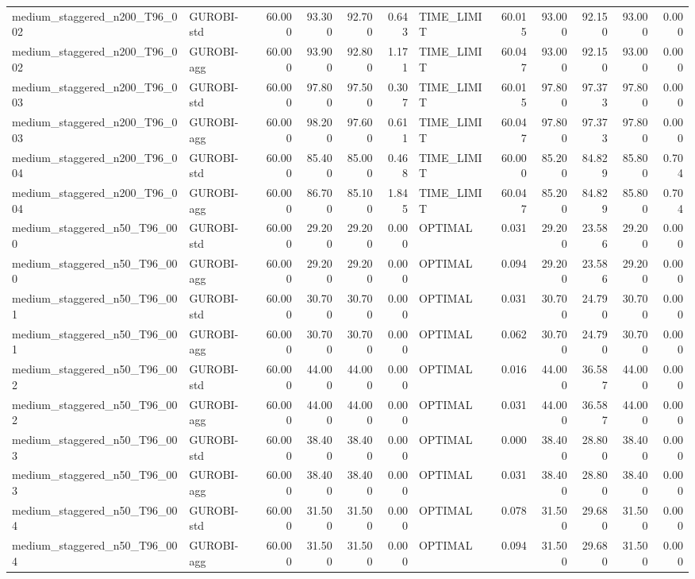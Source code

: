 \begin{table}[htbp]
\begin{tabular}{llrrrrlrrrrr}
medium\_staggered\_n200\_T96\_002 & GUROBI-std & 60.000 & 93.300 & 92.700 & 0.643 & TIME\_LIMIT & 60.015 & 93.000 & 92.150 & 93.000 & 0.000 \\
medium\_staggered\_n200\_T96\_002 & GUROBI-agg & 60.000 & 93.900 & 92.800 & 1.171 & TIME\_LIMIT & 60.047 & 93.000 & 92.150 & 93.000 & 0.000 \\
medium\_staggered\_n200\_T96\_003 & GUROBI-std & 60.000 & 97.800 & 97.500 & 0.307 & TIME\_LIMIT & 60.015 & 97.800 & 97.373 & 97.800 & 0.000 \\
medium\_staggered\_n200\_T96\_003 & GUROBI-agg & 60.000 & 98.200 & 97.600 & 0.611 & TIME\_LIMIT & 60.047 & 97.800 & 97.373 & 97.800 & 0.000 \\
medium\_staggered\_n200\_T96\_004 & GUROBI-std & 60.000 & 85.400 & 85.000 & 0.468 & TIME\_LIMIT & 60.000 & 85.200 & 84.829 & 85.800 & 0.704 \\
medium\_staggered\_n200\_T96\_004 & GUROBI-agg & 60.000 & 86.700 & 85.100 & 1.845 & TIME\_LIMIT & 60.047 & 85.200 & 84.829 & 85.800 & 0.704 \\
medium\_staggered\_n50\_T96\_000 & GUROBI-std & 60.000 & 29.200 & 29.200 & 0.000 & OPTIMAL & 0.031 & 29.200 & 23.586 & 29.200 & 0.000 \\
medium\_staggered\_n50\_T96\_000 & GUROBI-agg & 60.000 & 29.200 & 29.200 & 0.000 & OPTIMAL & 0.094 & 29.200 & 23.586 & 29.200 & 0.000 \\
medium\_staggered\_n50\_T96\_001 & GUROBI-std & 60.000 & 30.700 & 30.700 & 0.000 & OPTIMAL & 0.031 & 30.700 & 24.790 & 30.700 & 0.000 \\
medium\_staggered\_n50\_T96\_001 & GUROBI-agg & 60.000 & 30.700 & 30.700 & 0.000 & OPTIMAL & 0.062 & 30.700 & 24.790 & 30.700 & 0.000 \\
medium\_staggered\_n50\_T96\_002 & GUROBI-std & 60.000 & 44.000 & 44.000 & 0.000 & OPTIMAL & 0.016 & 44.000 & 36.587 & 44.000 & 0.000 \\
medium\_staggered\_n50\_T96\_002 & GUROBI-agg & 60.000 & 44.000 & 44.000 & 0.000 & OPTIMAL & 0.031 & 44.000 & 36.587 & 44.000 & 0.000 \\
medium\_staggered\_n50\_T96\_003 & GUROBI-std & 60.000 & 38.400 & 38.400 & 0.000 & OPTIMAL & 0.000 & 38.400 & 28.800 & 38.400 & 0.000 \\
medium\_staggered\_n50\_T96\_003 & GUROBI-agg & 60.000 & 38.400 & 38.400 & 0.000 & OPTIMAL & 0.031 & 38.400 & 28.800 & 38.400 & 0.000 \\
medium\_staggered\_n50\_T96\_004 & GUROBI-std & 60.000 & 31.500 & 31.500 & 0.000 & OPTIMAL & 0.078 & 31.500 & 29.680 & 31.500 & 0.000 \\
medium\_staggered\_n50\_T96\_004 & GUROBI-agg & 60.000 & 31.500 & 31.500 & 0.000 & OPTIMAL & 0.094 & 31.500 & 29.680 & 31.500 & 0.000 \\
\bottomrule
\end{tabular}
\end{table}
